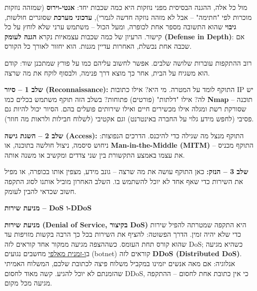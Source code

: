 \documentclass[11pt]{article}
\newcommand{\enLR}[1]{\textenglish{#1}}
\newcommand{\sectionheading}[1]{\vskip10pt\penalty-200{\large\bfseries\color{h2}#1\par}\vskip3pt}
\newcommand{\subheading}[1]{\vskip6pt{\bfseries\color{h3}#1\par}\vskip2pt}
\begin{document}
מול כל אלה, ההגנה הבסיסית מפני נוזקות היא כמה שכבות יחד: \textbf{אנטי-וירוס} (שמזהה נוזקות מוכרות לפי "חתימה" – אבל לא מזהה נוזקה חדשה לגמרי), \textbf{עדכוני מערכת} שסוגרים חולשות, \textbf{גיבוי} שהוא התשובה מספר אחת לכופרה, ומעל הכול – משתמש ערני שלא לוחץ על כל קישור. הרעיון של כמה שכבות עצמאיות נקרא \textbf{הגנה לעומק \enLR{(Defense in Depth)}}: אם שכבה אחת נכשלת, האחרות עדיין מגנות. הוא יחזור לאורך כל הקורס.\par

\sectionheading{\enLR{1.8} איך נראית התקפה מההתחלה עד הסוף}

רוב ההתקפות עוברות שלושה שלבים. אפשר לחשוב עליהם כמו על פורץ שמתכנן שוד: קודם הוא משגיח על הבית, אחר כך מוצא דרך פנימה, ולבסוף לוקח את מה שרצה.\par

\textbf{שלב \enLR{1} – סיור \enLR{(Reconnaissance)}:} התוקף לומד על המטרה. מי היא? אילו כתובות \enLR{IP} יש לה? אילו "דלתות" (פורטים) פתוחות? בשלב הזה תוקף משתמש בכלים כמו \textbf{\enLR{Nmap}} – תוכנה שסורקת רשת ומגלה אילו מכשירים חיים ואילו שירותים פועלים בהם. הסיור יכול להיות גם פסיבי (לחפש מידע גלוי על החברה באינטרנט) וגם אקטיבי (לשלוח חבילות ולראות מה חוזר).\par

\textbf{שלב \enLR{2} – השגת גישה \enLR{(Access)}:} התוקף מנצל מה שגילה כדי להיכנס. הדרכים הנפוצות: ניחוש סיסמה, ניצול חולשה בתוכנה, או \textbf{\enLR{Man-in-the-Middle (MITM)}} – התוקף מכניס את עצמו באמצע התקשורת בין שני צדדים ומקשיב או משנה אותה.\par

\textbf{שלב \enLR{3} – הנזק:} כאן התוקף עושה את מה שרצה – גונב מידע, מצפין אותו בכופרה, או מפיל את השירות כדי שאף אחד לא יוכל להשתמש בו. השלב האחרון מוביל אותנו לסוג התקפה חשוב שכדאי להבין לעומק.\par

\subheading{מניעת שירות – \enLR{DoS} ו-\enLR{DDoS}}

\textbf{מניעת שירות \enLR{(Denial of Service}, בקיצור \enLR{DoS)}} היא התקפה שמטרתה להפיל שירות כדי שלא יהיה זמין. הדרך הפשוטה: להציף את השירות בכל כך הרבה בקשות מזויפות עד שהוא קורס תחת העומס. כשההצפה מגיעה ממקור אחד קוראים לזה \enLR{DoS}; כשהיא מגיעה ב\underline{ו-זמנית מאלפי} מחשבים נגועים \enLR{(botnet)} קוראים לזה \textbf{\enLR{DDoS (Distributed DoS)}}. אנלוגיה: אם מאה אנשים יזמינו במקביל משלוח פיצה לכתובת שלכם, המשלוח האמיתי שהזמנתם לא יוכל להגיע. קשה מאוד לחסום \enLR{DDoS}, כי אין כתובת אחת לחסום – ההתקפה מגיעה מכל מקום.\par
\end{document}
